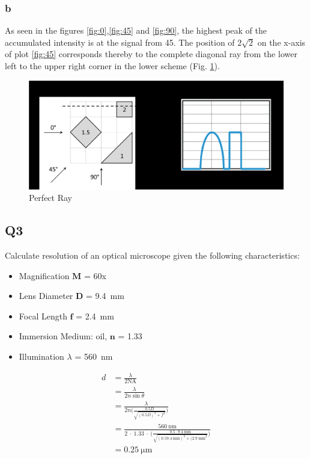 \subsubsection*{b}
As seen in the figures \ref{fig:0},\ref{fig:45} and \ref{fig:90}, the highest peak of the accumulated intensity is at the signal from 45\textdegree. The position of $2\sqrt{2}$ on the x-axis of plot \ref{fig:45} corresponds thereby to the complete diagonal ray from the lower left to the upper right corner in the lower scheme (Fig. \ref{fig:perfect_ray}).
\begin{figure}[!htb]
    \centering
    \includegraphics[clip,width=.6\linewidth,trim=9mm 0mm 115mm 13mm]{./midterm/img/Rays.png}
    \caption{Perfect Ray}
    \label{fig:perfect_ray}
\end{figure}



\subsection*{Q3}
Calculate resolution of an optical microscope given the following characteristics:
\begin{itemize}
    \item Magnification $\textbf{M}$ = 60x
    \item Lens Diameter $\textbf{D}$ = \SI{9.4}{\milli\meter}
    \item Focal Length $\textbf{f}$ = \SI{2.4}{\mm}
    \item Immersion Medium: oil, $\textbf{n}$ = 1.33
    \item Illumination \boldmath$\lambda$ = \SI{560}{\nm}
\end{itemize}

\begin{align}
    d &= \frac{\lambda}{2 \mathrm{NA}} \\
    &= \frac{\lambda}{2 n \sin{\theta}} \\
    &= \frac{\lambda}{2 n \Big(\frac{0.5 D}{\sqrt{(0.5 D)^2 + f^2}}\Big)}\\
    &= \frac{\SI{560}{\nano\meter}}{2\ \cdot\ \num{1.33}\ \cdot\ \Big(\frac{0.5 \cdot \SI{9.4}{\mm}}{\sqrt{(0.5 \SI{9.4}{\mm})^2 + (\SI{2.9}{\mm}^2}}\Big)}\\
    &= \SI{0.25}{\micro\meter}
\end{align}

